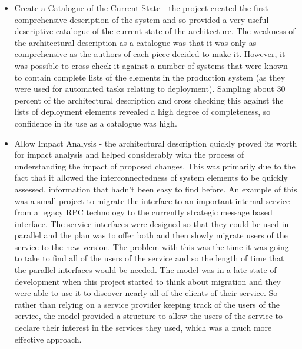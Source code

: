 \begin{itemize}

\item Create a Catalogue of the Current State - the project created the first comprehensive description of the system and so provided a very useful descriptive catalogue of the current state of the architecture.  The weakness of the architectural description as a catalogue was that it was only as comprehensive as the authors of each piece decided to make it.  However, it was possible to cross check it against a number of systems that were known to contain complete lists of the elements in the production system (as they were used for automated tasks relating to deployment).  Sampling about 30 percent of the architectural description and cross checking this against the lists of deployment elements revealed a high degree of completeness, so confidence in its use as a catalogue was high.

\item Allow Impact Analysis - the architectural description quickly proved its worth for impact analysis and helped considerably with the process of understanding the impact of proposed changes.  This was primarily due to the fact that it allowed the interconnectedness of system elements to be quickly assessed, information that hadn't been easy to find before.  An example of this was a small project to migrate the interface to an important internal service from a legacy RPC technology to the currently strategic message based interface.  The service interfaces were designed so that they could be used in parallel and the plan was to offer both and then slowly migrate users of the service to the new version.  The problem with this was the time it was going to take to find all of the users of the service and so the length of time that the parallel interfaces would be needed.  The model was in a late state of development when this project started to think about migration and they were able to use it to discover nearly all of the clients of their service.  So rather than relying on a service provider keeping track of the users of the service, the model provided a structure to allow the users of the service to declare their interest in the services they used, which was a much more effective approach.


\end{itemize}
